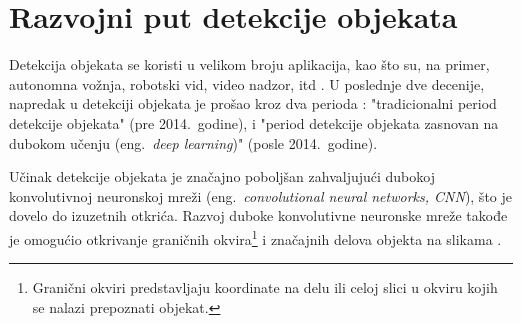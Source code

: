 \documentclass[12pt,oneside]{memoir}
\begin{document}

\section{Razvojni put detekcije objekata}
\label{section2_detekcijaobjekta}

Detekcija objekata se koristi u velikom broju aplikacija, kao što su, na primer, autonomna vožnja, robotski vid, video nadzor, itd \cite{zou2019object}. U poslednje dve decenije, napredak u detekciji objekata je prošao kroz dva perioda \cite{zou2019object}: "tradicionalni period detekcije objekata" (pre 2014.~godine), i "period detekcije objekata zasnovan na dubokom učenju (eng.~\textit{deep learning})" (posle 2014.~godine).

Učinak detekcije objekata je značajno poboljšan zahvaljujući dubokoj konvolutivnoj neuronskoj mreži (eng.~\textit{convolutional neural networks, CNN}), što je dovelo do izuzetnih otkrića.
Razvoj duboke konvolutivne neuronske mreže takođe je omogućio otkrivanje graničnih okvira\footnote{Granični okviri predstavljaju koordinate na delu ili celoj slici u okviru kojih se nalazi prepoznati objekat.} i značajnih delova objekta na slikama \cite{girshick2014rich, ren2015faster, kang2017t, amit2020object}.
\end{document}
